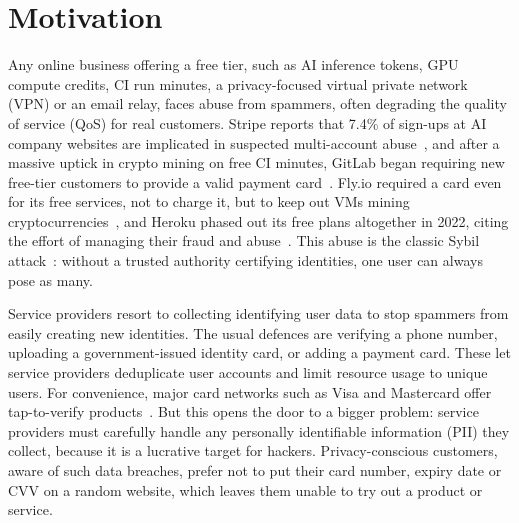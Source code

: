 \documentclass[10pt,a4paper]{article}
\begin{document}
\section{Motivation}

Any online business offering a free tier, such as AI inference tokens, GPU compute credits, CI run minutes, a privacy-focused virtual private network (VPN) or an email relay, faces abuse from spammers, often degrading the quality of service (QoS) for real customers.
Stripe reports that 7.4\% of sign-ups at AI company websites are implicated in suspected multi-account abuse~\cite{stripe-abuse}, and after a massive uptick in crypto mining on free CI minutes, GitLab began requiring new free-tier customers to provide a valid payment card~\cite{gitlab-crypto-mining}.
Fly.io required a card even for its free services, not to charge it, but to keep out VMs mining cryptocurrencies~\cite{flyio-free-postgres}, and Heroku phased out its free plans altogether in 2022, citing the effort of managing their fraud and abuse~\cite{heroku-next-chapter}.
This abuse is the classic Sybil attack~\cite{DBLP:conf/iptps/Douceur02}: without a trusted authority certifying identities, one user can always pose as many.

Service providers resort to collecting identifying user data to stop spammers from easily creating new identities.
The usual defences are verifying a phone number, uploading a government-issued identity card, or adding a payment card.
These let service providers deduplicate user accounts and limit resource usage to unique users.
For convenience, major card networks such as Visa and Mastercard offer tap-to-verify products~\cite{visa-tap,mc-tap-to-verify}.
But this opens the door to a bigger problem: service providers must carefully handle any personally identifiable information (PII) they collect, because it is a lucrative target for hackers.
Privacy-conscious customers, aware of such data breaches, prefer not to put their card number, expiry date or CVV on a random website, which leaves them unable to try out a product or service.
\end{document}
